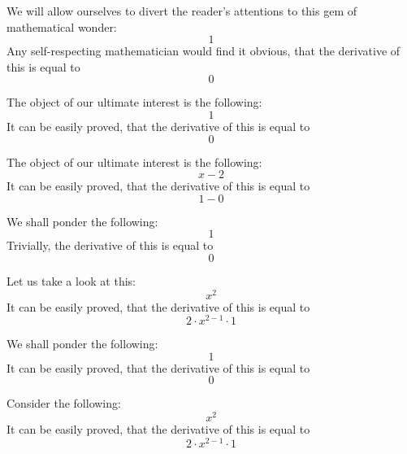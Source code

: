 \documentclass{article}
\begin{document}
We will allow ourselves to divert the reader's attentions to this gem of mathematical wonder:
\begin{equation}
1 
\end{equation}
Any self-respecting mathematician would find it obvious, that the derivative of this is equal to
\begin{equation}
0 
\end{equation}

The object of our ultimate interest is the following:
\begin{equation}
1 
\end{equation}
It can be easily proved, that the derivative of this is equal to
\begin{equation}
0 
\end{equation}

The object of our ultimate interest is the following:
\begin{equation}
x - 2 
\end{equation}
It can be easily proved, that the derivative of this is equal to
\begin{equation}
1 - 0 
\end{equation}

We shall ponder the following:
\begin{equation}
1 
\end{equation}
Trivially, the derivative of this is equal to
\begin{equation}
0 
\end{equation}

Let us take a look at this:
\begin{equation}
x ^{2 } 
\end{equation}
It can be easily proved, that the derivative of this is equal to
\begin{equation}
2 \cdot x ^{2 - 1 } \cdot 1 
\end{equation}

We shall ponder the following:
\begin{equation}
1 
\end{equation}
It can be easily proved, that the derivative of this is equal to
\begin{equation}
0 
\end{equation}

Consider the following:
\begin{equation}
x ^{2 } 
\end{equation}
It can be easily proved, that the derivative of this is equal to
\begin{equation}
2 \cdot x ^{2 - 1 } \cdot 1 
\end{equation}
\end{document}
